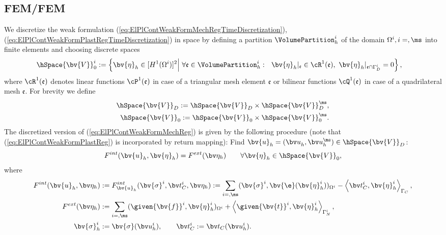 \subsection{FEM/FEM} \label{sec:FEMFEM}
We discretize the weak formulation (\ref{eq:ElPlContWeakFormMechRegTimeDiscretization}),(\ref{eq:ElPlContWeakFormPlastRegTimeDiscretization}) in space by defining a partition $\VolumePartition^i_h$ of the domain $\Omega^i, i=\sl,\ms$ into finite elements and choosing  discrete spaces 
\begin{align*}
\hSpace{\bv{V}}^i_{0} &:= \left\lbrace \bv{\eta}_h \in [H^1(\Omega^i)]^2 \middle|~\forall \mathfrak{e}\in\VolumePartition^i_h:~~ \bv{\eta}_h|_{\mathfrak{e}} \in \cR^1(\mathfrak{e}),~ \bv{\eta}_h|_{\mathfrak{e} \cap \Gamma_D^i} =  0 \right\rbrace,
\end{align*}
where $\cR^1(\mathfrak{e})$ denotes linear functions $\cP^1(\mathfrak{e})$ in case of  a triangular mesh element $\mathfrak{e}$ or bilinear functions $\cQ^1(\mathfrak{e})$ in case of a quadrilateral mesh $\mathfrak{e}$. For brevity we define
\begin{align*}
\hSpace{\bv{V}}_{D} := \hSpace{\bv{V}}^{\sl}_{D} \times \hSpace{\bv{V}}^{\ms}_{D}, \\
\hSpace{\bv{V}}_{0} := \hSpace{\bv{V}}^{\sl}_{0} \times \hSpace{\bv{V}}^{\ms}_{0}.
\end{align*}
The discretized version of (\ref{eq:ElPlContWeakFormMechReg}) is given by the following procedure (note that (\ref{eq:ElPlContWeakFormPlastReg}) is incorporated by return mapping): Find $\bv{u}_{h} = (\bv u^{\sl}_h,\bv u^{\ms}_h) \in \hSpace{\bv{V}}_D$:
\begin{equation}  \label{WeakFormF}
F^{int}(\bv{u}_{h},\bv{\eta}_h) = F^{ext}(\bv\eta_h) \qquad \forall \bv{\eta}_h \in \hSpace{\bv{V}}_0,
\end{equation}
where
\begin{align*}
F^{int}(\bv{u}_{h},\bv\eta_h) &:= F^{int}_{\bv{u}_{h}}(\bv{\sigma}^i,\bv t_C^i,\bv\eta_h) := \sum_{i=\sl,\ms} ( \bv{\sigma}^i, \bv{\e}(\bv{\eta}^i_h))_{\Omega^i}
- \left\langle \bv t_C^i, \bv{\eta}^i_h\right\rangle_{\Gamma_C}, \\
F^{ext}(\bv\eta_h) &:= \sum_{i=\sl,\ms} (\given{\bv{f}}^i, \bv{\eta}^i_h)_{\Omega^i}
+ \left\langle \given{\bv{t}}^i, \bv{\eta}^i_h \right\rangle_{\Gamma^i_N}, \\
\bv{\sigma}^i_h &:= \bv{\sigma}(\bv u^i_h), \qquad \bv t_C^i := \bv t_C(\bv u^i_h).
\end{align*}

